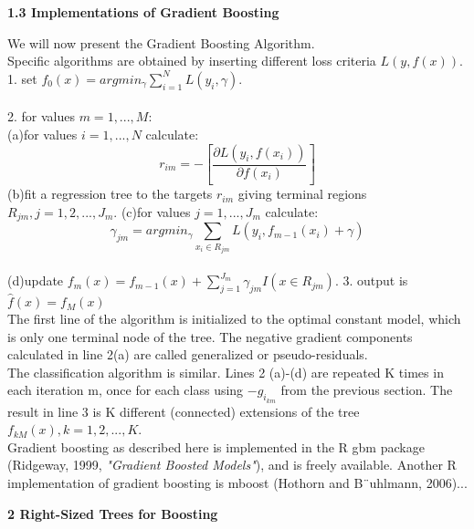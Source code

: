 \documentclass[12pt, letterpaper, twoside]{article}
\begin{document}
\begin{center}
\textbf{\large{1.3 Implementations of Gradient Boosting}}
\end{center}

\hspace*{4ex} We will now present the Gradient Boosting Algorithm.\\
Specific algorithms are obtained by inserting different loss criteria $L(y,f(x))$.
1. set $f_0(x)=argmin_{\gamma} \sum_{i=1}^N L(y_i,\gamma)$.\\\\
2. for values $m=1,...,M$:\\
\hspace*{4ex}(a)\space for values $i=1,...,N$ calculate:
\begin{equation*}
r_{im}=-[\frac{\partial L(y_i,f(x_i))}{\partial f(x_i)}]
\end{equation*}
\hspace*{4ex}(b)\space fit a regression tree to the targets $r_{im}$ giving terminal regions $R_{jm},j=1,2,...,J_m$.
\hspace*{4ex}(c)\space for values $j=1,...,J_m$ calculate:
\begin{equation*}
\gamma_{jm}=argmin_{\gamma}\sum_{x_i \in R_{jm}}L(y_i,f_{m-1}(x_i)+\gamma)
\end{equation*}\\
\hspace*{4ex}(d)\space update $f_m(x)=f_{m-1}(x)+\sum_{j=1}^{J_m} \gamma_{jm}I(x \in R_{jm})$.
3. output is $\hat{f}(x)=f_M(x)$\\
The first line of the algorithm is initialized to the optimal constant model, which is only one terminal node of the tree. The negative gradient components calculated in line 2(a) are called generalized or pseudo-residuals.\\
\hspace*{4ex}The classification algorithm is similar. Lines 2 (a)-(d) are repeated K times in each iteration m, once for each class using $−g_{i_{km}}$ from the previous section. The result in line 3 is K different (connected) extensions of the tree $f_{kM}(x),k=1,2,...,K$.\\
\hspace*{4ex}Gradient boosting as described here is implemented in the R gbm package (Ridgeway, 1999, \emph{"Gradient Boosted Models"}), and is freely available. Another R implementation of gradient boosting is mboost (Hothorn and B¨uhlmann, 2006)...
\begin{center}
\textbf{\large{2 Right-Sized Trees for Boosting}\\}
\end{center}
\end{document}
